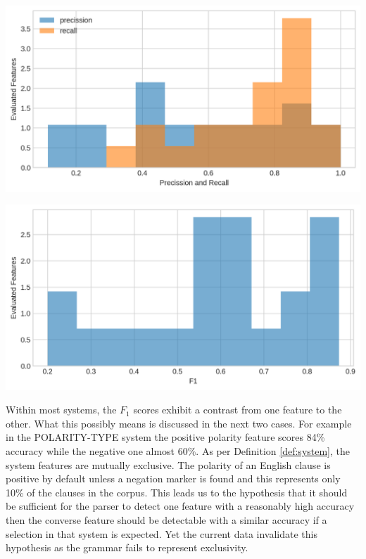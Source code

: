     \vspace{1em}
    \noindent
    \begin{minipage}[b]{0.49\textwidth}
        \centering
        \includegraphics[width=\textwidth]{evaluation-results/figures-old/accuracy-syntactic-mood-precission-recall.png}
        \label{fig:mood-precission-recall}
    \end{minipage}
    \quad
    \begin{minipage}[b]{0.49\textwidth}
        \centering
        \includegraphics[width=\textwidth]{evaluation-results/figures-old/accuracy-syntactic-mood-f1.png}
        \label{fig:mood-precission-f1}
    \end{minipage}
    \vspace{.5em}
    
    Within most systems, the $F_1$ scores exhibit a contrast from one feature to the other. What this possibly means is discussed in the next two cases. For example in the POLARITY-TYPE system the positive polarity feature scores 84\% accuracy while the negative one almost 60\%. As per Definition \ref{def:system}, the system features are mutually exclusive. The polarity of an English clause is positive by default unless a negation marker is found and this represents only 10\% of the clauses in  the corpus. This leads us to the hypothesis that it should be sufficient for the parser to detect one feature with a reasonably high accuracy then the converse feature should be detectable with a similar accuracy if a selection in that system is expected. Yet the current data invalidate this hypothesis as the grammar fails to represent exclusivity.
    
